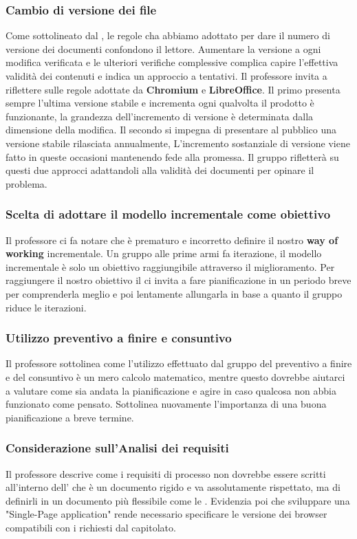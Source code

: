 \subsubsection{Cambio di versione dei file}
Come sottolineato dal \VT{}, le regole cha abbiamo adottato per dare il numero di versione dei documenti confondono il lettore.
Aumentare la versione a ogni modifica verificata e le ulteriori verifiche complessive complica capire l'effettiva validità dei contenuti e indica un approccio a tentativi.
Il professore invita a riflettere sulle regole adottate da \textbf{Chromium} e \textbf{LibreOffice}.
Il primo presenta sempre l'ultima versione stabile e incrementa ogni qualvolta il prodotto è funzionante, la grandezza dell'incremento di versione è determinata dalla dimensione della modifica.
Il secondo si impegna di presentare al pubblico una versione stabile rilasciata annualmente, L'incremento sostanziale di versione viene fatto in queste occasioni mantenendo fede alla promessa.
Il gruppo rifletterà su questi due approcci adattandoli alla validità dei documenti per opinare il problema.
\subsubsection{Scelta di adottare il modello incrementale come obiettivo}
Il professore ci fa notare che è prematuro e incorretto definire il nostro \textbf{way of working} incrementale.
Un gruppo alle prime armi fa iterazione, il modello incrementale è solo un obiettivo raggiungibile attraverso il miglioramento.
Per raggiungere il nostro obiettivo il \VT{} ci invita a fare pianificazione in un periodo breve per comprenderla meglio e poi lentamente allungarla in base a quanto il gruppo riduce le iterazioni.
\subsubsection{Utilizzo preventivo a finire e consuntivo}
Il professore sottolinea come l'utilizzo effettuato dal gruppo del preventivo a finire e del consuntivo è un mero calcolo matematico, mentre questo dovrebbe aiutarci a valutare come sia andata la pianificazione e agire in caso qualcosa non abbia funzionato come pensato. Sottolinea nuovamente l'importanza di una buona pianificazione a breve termine.
\subsubsection{Considerazione sull'Analisi dei requisiti}
Il professore descrive come i requisiti di processo non dovrebbe essere scritti all'interno dell'\AdR{} che è un documento rigido e va assolutamente rispettato, ma di definirli in un documento più flessibile come le \NdP{}.
Evidenzia poi che sviluppare una "Single-Page application" rende necessario specificare le versione dei browser compatibili con i  richiesti dal capitolato.
